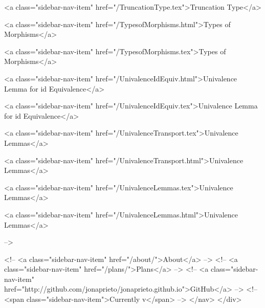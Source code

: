       
    
      
        
          <a class="sidebar-nav-item" href="/TruncationType.tex">Truncation Type</a>
        
      
    
      
        
          <a class="sidebar-nav-item" href="/TypesofMorphisms.html">Types of Morphisms</a>
        
      
    
      
        
          <a class="sidebar-nav-item" href="/TypesofMorphisms.tex">Types of Morphisms</a>
        
      
    
      
        
          <a class="sidebar-nav-item" href="/UnivalenceIdEquiv.html">Univalence Lemma for id Equivalence</a>
        
      
    
      
        
          <a class="sidebar-nav-item" href="/UnivalenceIdEquiv.tex">Univalence Lemma for id Equivalence</a>
        
      
    
      
        
          <a class="sidebar-nav-item" href="/UnivalenceTransport.tex">Univalence Lemmas</a>
        
      
    
      
        
          <a class="sidebar-nav-item" href="/UnivalenceTransport.html">Univalence Lemmas</a>
        
      
    
      
        
          <a class="sidebar-nav-item" href="/UnivalenceLemmas.tex">Univalence Lemmas</a>
        
      
    
      
        
          <a class="sidebar-nav-item" href="/UnivalenceLemmas.html">Univalence Lemmas</a>
        
      
     -->

    <!-- <a class="sidebar-nav-item" href="/about/">About</a> -->
    <!-- <a class="sidebar-nav-item" href="/plans/">Plans</a> -->
    <!-- <a class="sidebar-nav-item" href="http://github.com/jonaprieto/jonaprieto.github.io">GitHub</a> -->
    <!-- <span class="sidebar-nav-item">Currently v</span> -->
  </nav>
</div>

